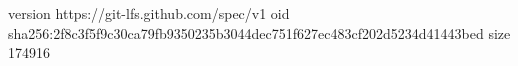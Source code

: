 version https://git-lfs.github.com/spec/v1
oid sha256:2f8c3f5f9c30ca79fb9350235b3044dec751f627ec483cf202d5234d41443bed
size 174916

